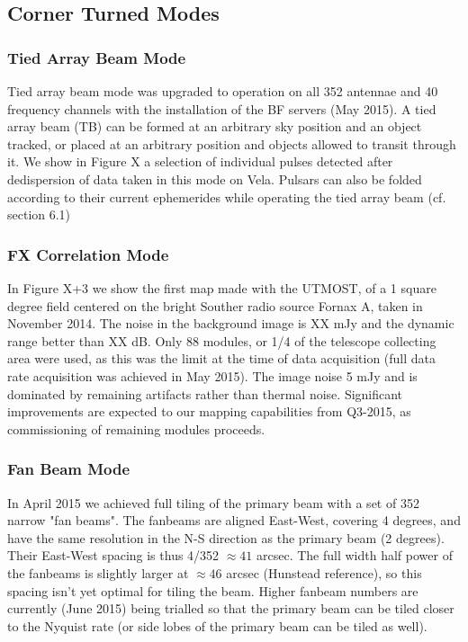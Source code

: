 \subsection{Corner Turned Modes}
\subsubsection{Tied Array Beam Mode}

Tied array beam mode was upgraded to operation on all 352 antennae and 40 frequency channels with the installation of the BF servers (May 2015). A tied array beam (TB) can be formed at an arbitrary sky position and an object tracked, or placed at an arbitrary position and objects allowed to transit through it. We show in Figure X a selection of individual pulses detected after dedispersion of data taken in this mode on Vela. Pulsars can also be folded according to their current ephemerides while operating the tied array beam (cf. section 6.1) 

\subsubsection{FX Correlation Mode}

In Figure X+3 we show the first map made with the UTMOST, of a 1 square degree field centered on the bright Souther radio source Fornax A, taken in November 2014. The noise in the background image is XX mJy and the dynamic range better than XX dB. Only 88 modules, or 1/4 of the telescope collecting area were used, as this was the limit at the time of data acquisition (full data rate acquisition was achieved in May 2015). The image noise 5 mJy and is dominated by remaining artifacts rather than thermal noise. Significant improvements are expected to our mapping capabilities from Q3-2015, as commissioning of remaining modules proceeds. 

\subsubsection{Fan Beam Mode}

In April 2015 we achieved full tiling of the primary beam with a set of 352 narrow "fan beams". The fanbeams are aligned East-West, covering 4 degrees, and have the same resolution in the N-S direction as the primary beam (2 degrees). Their East-West spacing is thus 4/352 $\approx 41$ arcsec. The full width half power of the fanbeams is slightly larger at $\approx 46$ arcsec (Hunstead reference), so this spacing isn't yet optimal for tiling the beam. Higher fanbeam numbers are currently (June 2015) being trialled so that the primary beam can be tiled closer to the Nyquist rate (or side lobes of the primary beam can be tiled as well).   

